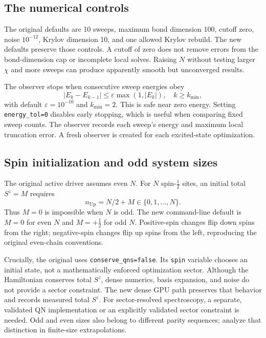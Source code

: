\documentclass[11pt]{article}
\newcommand{\code}[1]{\nolinkurl{#1}}
\begin{document}
\subsection{The numerical controls}
The original defaults are 10 sweeps, maximum bond dimension 100, cutoff zero, noise $10^{-12}$, Krylov dimension 10, and one allowed Krylov rebuild. The new defaults preserve those controls. A cutoff of zero does not remove errors from the bond-dimension cap or incomplete local solves. Raising $N$ without testing larger $\chi$ and more sweeps can produce apparently smooth but unconverged results.

The observer stops when consecutive sweep energies obey
\begin{equation}
|E_k-E_{k-1}|\leq\varepsilon\max(1,|E_k|),\quad k\geq k_{\min},
\end{equation}
with default $\varepsilon=10^{-10}$ and $k_{\min}=2$. This is safe near zero energy. Setting \code{energy_tol=0} disables early stopping, which is useful when comparing fixed sweep counts. The observer records each sweep's energy and maximum local truncation error. A fresh observer is created for each excited-state optimization.

\subsection{Spin initialization and odd system sizes}
The original active driver assumes even $N$. For $N$ spin-$\tfrac12$ sites, an initial total $S^z=M$ requires
\begin{equation}
n_{\mathrm{Up}}=N/2+M\in\{0,1,\ldots,N\}.
\end{equation}
Thus $M=0$ is impossible when $N$ is odd. The new command-line default is $M=0$ for even $N$ and $M=+\tfrac12$ for odd $N$. Positive-spin changes flip down spins from the right; negative-spin changes flip up spins from the left, reproducing the original even-chain conventions.

Crucially, the original uses \code{conserve_qns=false}. Its \code{spin} variable chooses an initial state, not a mathematically enforced optimization sector. Although the Hamiltonian conserves total $S^z$, dense numerics, basis expansion, and noise do not provide a sector constraint. The new dense GPU path preserves that behavior and records measured total $S^z$. For sector-resolved spectroscopy, a separate, validated QN implementation or an explicitly validated sector constraint is needed. Odd and even sizes also belong to different parity sequences; analyze that distinction in finite-size extrapolations.
\end{document}
